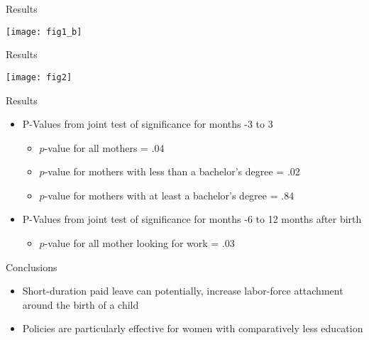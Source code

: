 \documentclass{beamer}
\begin{document}
\begin{frame}{Results}
	\begin{center}
	\texttt{[image: fig1\_b]}
	\end{center}
\end{frame}

\begin{frame}{Results}
	\begin{center}
	\texttt{[image: fig2]}
	\end{center}
\end{frame}

\begin{frame}{Results}
	\begin{itemize}
	\item
	 P-Values from joint test of significance for months -3 to 3
		 \begin{itemize}
		  \item
		   $p$-value for all mothers = .04
		  \item
		   $p$-value for mothers with less than a bachelor's degree = .02
		  \item
		   $p$-value for mothers with at least a bachelor's degree = .84
	 	 \end{itemize}
	 	 \item
	 P-Values from joint test of significance for months -6 to 12 months after birth
		 \begin{itemize}
		  \item
		   $p$-value for all mother looking for work = .03
	 	 \end{itemize}
	\end{itemize}
\end{frame}
\begin{frame}{Conclusions}
	\begin{itemize}
	\item
	 Short-duration paid leave can potentially, increase labor-force attachment around the birth of a child
	\item
	 Policies are particularly effective for women with comparatively less education
	\end{itemize}
\end{frame}
\end{document}
